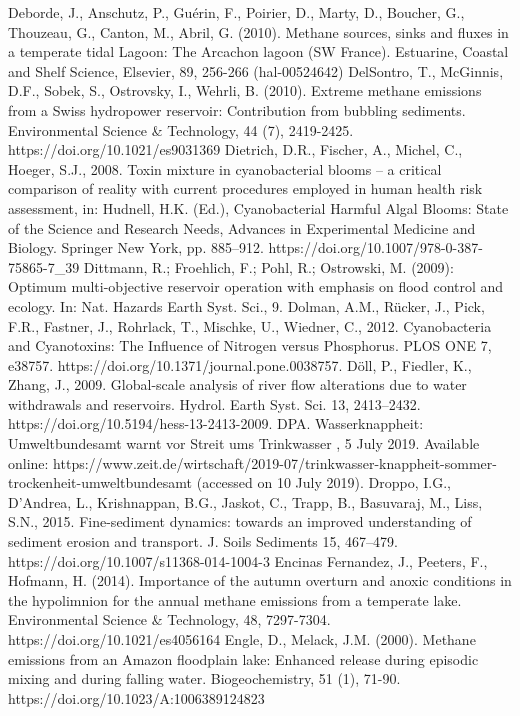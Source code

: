 \begin{thebibliography}{}
Deborde, J., Anschutz, P., Guérin, F., Poirier, D., Marty, D., Boucher, G., Thouzeau, G., Canton, M., Abril, G. (2010). Methane sources, sinks and fluxes in a temperate tidal Lagoon: The Arcachon lagoon (SW France). Estuarine, Coastal and Shelf Science, Elsevier, 89, 256-266 (hal-00524642)
DelSontro, T., McGinnis, D.F., Sobek, S., Ostrovsky, I., Wehrli, B. (2010). Extreme methane emissions from a Swiss hydropower reservoir: Contribution from bubbling sediments. Environmental Science & Technology, 44 (7), 2419-2425. https://doi.org/10.1021/es9031369
Dietrich, D.R., Fischer, A., Michel, C., Hoeger, S.J., 2008. Toxin mixture in cyanobacterial blooms – a critical comparison of reality with current procedures employed in human health risk assessment, in: Hudnell, H.K. (Ed.), Cyanobacterial Harmful Algal Blooms: State of the Science and Research Needs, Advances in Experimental Medicine and Biology. Springer New York, pp. 885–912. https://doi.org/10.1007/978-0-387-75865-7_39
Dittmann, R.; Froehlich, F.; Pohl, R.; Ostrowski, M. (2009): Optimum multi-objective reservoir operation with emphasis on flood control and ecology. In: Nat. Hazards Earth Syst. Sci., 9.
Dolman, A.M., Rücker, J., Pick, F.R., Fastner, J., Rohrlack, T., Mischke, U., Wiedner, C., 2012. Cyanobacteria and Cyanotoxins: The Influence of Nitrogen versus Phosphorus. PLOS ONE 7, e38757. https://doi.org/10.1371/journal.pone.0038757.
Döll, P., Fiedler, K., Zhang, J., 2009. Global-scale analysis of river flow alterations due to water withdrawals and reservoirs. Hydrol. Earth Syst. Sci. 13, 2413–2432. https://doi.org/10.5194/hess-13-2413-2009.
DPA. Wasserknappheit: Umweltbundesamt warnt vor Streit ums Trinkwasser , 5 July 2019. Available online: https://www.zeit.de/wirtschaft/2019-07/trinkwasser-knappheit-sommer-trockenheit-umweltbundesamt (accessed on 10 July 2019).
Droppo, I.G., D’Andrea, L., Krishnappan, B.G., Jaskot, C., Trapp, B., Basuvaraj, M., Liss, S.N., 2015. Fine-sediment dynamics: towards an improved understanding of sediment erosion and transport. J. Soils Sediments 15, 467–479. https://doi.org/10.1007/s11368-014-1004-3
Encinas Fernandez, J., Peeters, F., Hofmann, H. (2014). Importance of the autumn overturn and anoxic conditions in the hypolimnion for the annual methane emissions from a temperate lake. Environmental Science & Technology, 48, 7297-7304. https://doi.org/10.1021/es4056164
Engle, D., Melack, J.M. (2000). Methane emissions from an Amazon floodplain lake: Enhanced release during episodic mixing and during falling water. Biogeochemistry, 51 (1), 71-90. https://doi.org/10.1023/A:1006389124823

\end{thebibliography}
